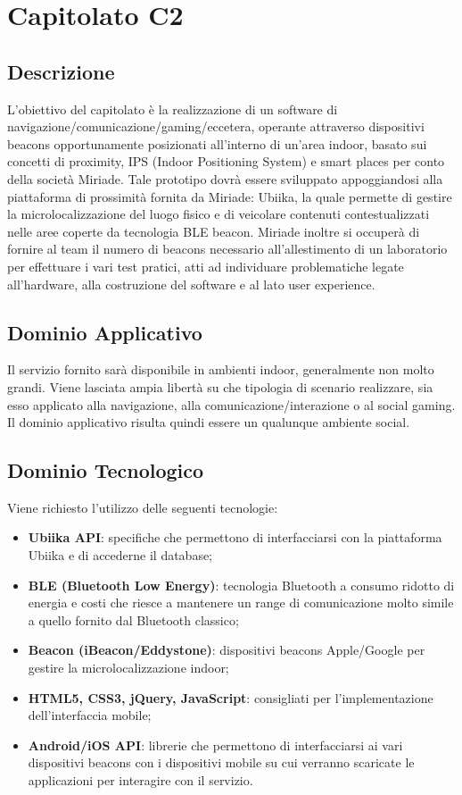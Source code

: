 \newpage
\section{Capitolato C2}
\subsection{Descrizione}
L'obiettivo del capitolato è la realizzazione di un software di navigazione/comunicazione/gaming/eccetera, operante attraverso dispositivi beacons opportunamente posizionati all'interno di un'area indoor, basato sui concetti di proximity, IPS (Indoor Positioning System) e smart places per conto della società Miriade. Tale prototipo dovrà essere sviluppato appoggiandosi alla piattaforma di prossimità fornita da Miriade: Ubiika, la quale permette di gestire la microlocalizzazione del luogo fisico e di veicolare contenuti contestualizzati nelle aree coperte da tecnologia BLE beacon. Miriade inoltre si occuperà di fornire al team il numero di beacons necessario all'allestimento di un laboratorio per effettuare i vari test pratici, atti ad individuare problematiche legate all'hardware, alla costruzione del software e al lato user experience.     

\subsection{Dominio Applicativo}
Il servizio fornito sarà disponibile in ambienti indoor, generalmente non molto grandi. Viene lasciata ampia libertà su che tipologia di scenario realizzare, sia esso applicato alla navigazione, alla comunicazione/interazione o al social gaming. Il dominio applicativo risulta quindi essere un qualunque ambiente social. 

\subsection{Dominio Tecnologico}
Viene richiesto l'utilizzo delle seguenti tecnologie:
\begin{itemize}
\item \textbf{Ubiika API}: specifiche che permettono di interfacciarsi con la piattaforma Ubiika e di accederne il database;
\item \textbf{BLE (Bluetooth Low Energy)}: tecnologia Bluetooth a consumo ridotto di energia e costi che riesce a mantenere un range di comunicazione molto simile a quello fornito dal Bluetooth classico;
\item \textbf{Beacon (iBeacon/Eddystone)}: dispositivi beacons Apple/Google per gestire la microlocalizzazione indoor;
\item \textbf{HTML5, CSS3, jQuery, JavaScript}: consigliati per l'implementazione dell'interfaccia mobile;
\item \textbf{Android/iOS API}: librerie che permettono di interfacciarsi ai vari dispositivi beacons con i dispositivi mobile su cui verranno scaricate le applicazioni per interagire con il servizio.
\end{itemize}

